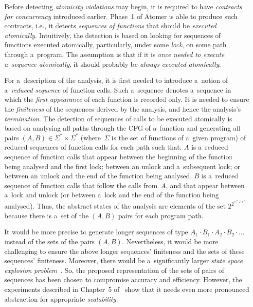 Before detecting \emph{atomicity violations} may begin, it is required to have \emph{contracts for concurrency} introduced earlier. Phase~1 of Atomer is able to produce such contracts, i.e., it detects \emph{sequences of functions} that should be \emph{executed atomically}. Intuitively, the detection is based on looking for sequences of functions executed atomically, particularly, under some \emph{lock}, on some path through a~program. The assumption is that if it is \emph{once needed to execute a~sequence atomically}, it should probably be \emph{always executed atomically}.

For a~description of the analysis, it is first needed to introduce a~notion of a~\emph{reduced sequence} of function calls. Such a~sequence denotes a~sequence in which the \emph{first appearance} of each function is recorded only. It is needed to ensure the \emph{finiteness} of the sequences derived by the analysis, and hence the analysis's \emph{termination}. The detection of sequences of calls to be executed atomically is based on analysing all paths through the CFG of a~function and generating all pairs $ (A, B) \in \Sigma^* \times \Sigma^* $ (where~$ \Sigma $ is the set of functions of a~given program) of reduced sequences of function calls for each path such that: $ A $ is a~reduced sequence of function calls that appear between the beginning of the function being analysed and the first lock; between an unlock and a~subsequent lock; or between an unlock and the end of the function being analysed. $ B $ is a~reduced sequence of function calls that follow the calls from~$ A $, and that appear between a~lock and unlock (or between a~lock and the end of the function being analysed). Thus, the abstract states of the analysis are elements of the set $ 2^{2^{\Sigma^* \times \Sigma^*}} $ because there is a~set of the $ (A, B) $ pairs for each program path.

It would be more precise to generate longer sequences of type $ A_1 \cdot B_1 \cdot A_2 \cdot B_2 \cdot \ldots\ $ instead of the sets of the pairs $ (A, B) $. Nevertheless, it would be more challenging to ensure the above longer sequences' finiteness and the sets of these sequences' finiteness. Moreover, there would be a~significantly larger \emph{state space explosion problem}~\cite{stateExpl}. So, the proposed representation of the sets of pairs of sequences has been chosen to compromise accuracy and efficiency. However, the experiments described in Chapter~5 of~\cite{harmimBP} show that it needs even more pronounced abstraction for appropriate \emph{scalability}.

